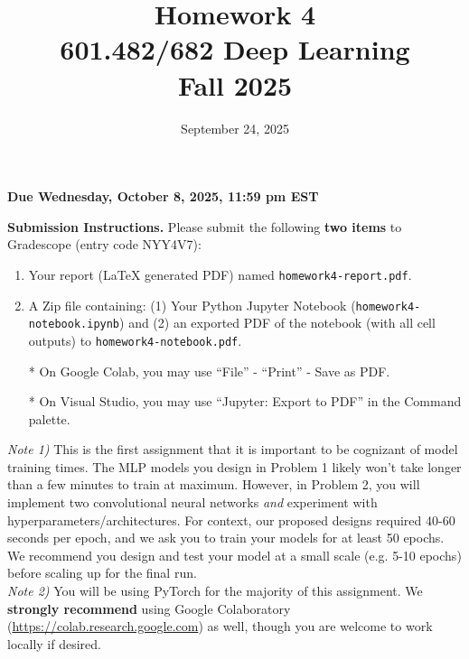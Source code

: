 \documentclass[a4paper]{article}
\title{Homework 4\\
	601.482/682 Deep Learning\\
	Fall 2025}
\date{September 24, 2025}
\begin{document}
	\maketitle
	
\centerline{\textbf{Due Wednesday, October 8, 2025, 11:59 pm EST}}
\vspace{0.2cm}

\noindent \textbf{Submission Instructions.} Please submit the following \textbf{two items} to Gradescope (entry code NYY4V7): 

\begin{enumerate}
    \item Your report (LaTeX generated PDF) named \texttt{homework4-report.pdf}.
    \item A Zip file containing: 
    (1) Your Python Jupyter Notebook (\texttt{homework4-notebook.ipynb}) and (2) an exported PDF of the notebook (with all cell outputs) to \texttt{homework4-notebook.pdf}.
    
    * On Google Colab, you may use ``File'' -\> ``Print'' -\> Save as PDF.
    
    * On Visual Studio, you may use ``Jupyter: Export to PDF'' in the Command palette.
\end{enumerate}

	\noindent \textit{Note 1)} This is the first assignment that it is important to be cognizant of model training times. The MLP models you design in Problem 1 likely won't take longer than a few minutes to train at maximum. However, in Problem 2, you will implement two convolutional neural networks \textit{and} experiment with hyperparameters/architectures. For context, our proposed designs required 40-60 seconds per epoch, and we ask you to train your models for at least 50 epochs. We recommend you design and test your model at a small scale (e.g. 5-10 epochs) before scaling up for the final run.\\
	
	\noindent \textit{Note 2)} You will be using PyTorch for the majority of this assignment. We \textbf{strongly recommend} using Google Colaboratory (\url{https://colab.research.google.com}) as well, though you are welcome to work locally if desired.
\end{document}

